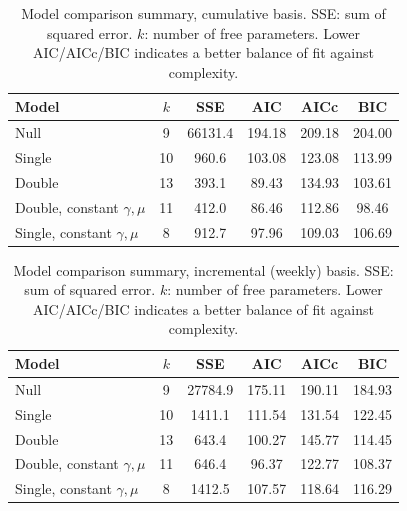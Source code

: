 \begin{table}[H]
    \centering
    \small
    \caption{Model comparison summary, cumulative basis. SSE: sum of squared error. $k$: number of free parameters. Lower AIC/AICc/BIC indicates a better balance of fit against complexity.}
    \begin{tabular}{lccccc}
        \toprule
        \textbf{Model} & \textbf{$k$} & \textbf{SSE} & \textbf{AIC} & \textbf{AICc} & \textbf{BIC} \\
        \midrule
        Null & 9 & 66131.4 & 194.18 & 209.18 & 204.00 \\
        Single & 10 & 960.6 & 103.08 & 123.08 & 113.99 \\
        Double & 13 & 393.1 & 89.43 & 134.93 & 103.61 \\
        Double, constant $\gamma,\mu$ & 11 & 412.0 & 86.46 & 112.86 & 98.46 \\
        Single, constant $\gamma,\mu$ & 8 & 912.7 & 97.96 & 109.03 & 106.69 \\
        \bottomrule
    \end{tabular}
    \label{tab:model_comparison_summary_cum}
\end{table}

\begin{table}[H]
    \centering
    \small
    \caption{Model comparison summary, incremental (weekly) basis. SSE: sum of squared error. $k$: number of free parameters. Lower AIC/AICc/BIC indicates a better balance of fit against complexity.}
    \begin{tabular}{lccccc}
        \toprule
        \textbf{Model} & \textbf{$k$} & \textbf{SSE} & \textbf{AIC} & \textbf{AICc} & \textbf{BIC} \\
        \midrule
        Null & 9 & 27784.9 & 175.11 & 190.11 & 184.93 \\
        Single & 10 & 1411.1 & 111.54 & 131.54 & 122.45 \\
        Double & 13 & 643.4 & 100.27 & 145.77 & 114.45 \\
        Double, constant $\gamma,\mu$ & 11 & 646.4 & 96.37 & 122.77 & 108.37 \\
        Single, constant $\gamma,\mu$ & 8 & 1412.5 & 107.57 & 118.64 & 116.29 \\
        \bottomrule
    \end{tabular}
    \label{tab:model_comparison_summary_incr}
\end{table}